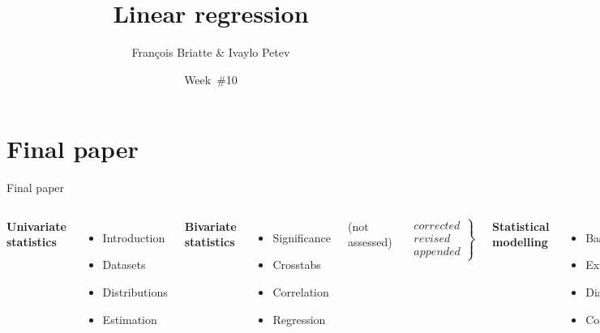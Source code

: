 \documentclass[t]{beamer}
\title{Linear regression}
\author{François Briatte \& Ivaylo Petev}
\date{Week~\#10}
\begin{document}
    

    \frame[plain]{
        \titlepage\\[7em]
        \tableofcontents[hideallsubsections]
        }

    

	\section{Final paper}

	\begin{frame}[t]{Final paper}
	
	\begin{columns}[T]
	\textbf{Univariate\\statistics}
	
	\vspace{.55em}
	\begin{itemize}
		\item Introduction
		\item Datasets
		\item Distributions
		\item Estimation
	\end{itemize}
	
	\textbf{Bivariate\\statistics}
	
	\begin{itemize}
		\item Significance
		\item Crosstabs
		\item Correlation
		\item Regression
	\end{itemize}
	(not assessed)
	
	$$
	\left.
    \begin{array}{rrr}
        corrected \\
        revised\\
        appended
    \end{array}
	\right \} 
	$$

	\textbf{Statistical\\modelling}
	
	\begin{itemize}
		\item Basics
		\item Extensions
		\item Diagnostics
		\item Conclusion
	\end{itemize}
	\\[.5em]
	\end{columns}
	
	\end{frame}
	
\end{document}
